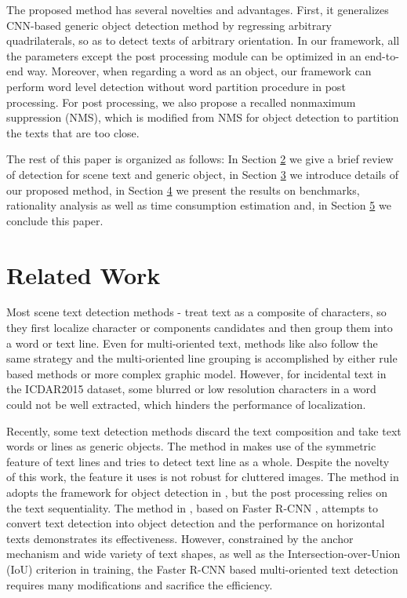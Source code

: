 \documentclass[10pt,twocolumn,letterpaper]{article}
\begin{document}
	The proposed method has several novelties and advantages.
	First, it generalizes CNN-based generic object detection method by regressing arbitrary quadrilaterals, so as to detect texts of arbitrary orientation. 
	In our framework, all the parameters except the post processing module can be optimized in an end-to-end way. 
	Moreover, when regarding a word as an object, our framework can perform word level detection without word partition procedure in post processing.
	For post processing, we also propose a recalled nonmaximum suppression (NMS), which is modified from NMS for object detection to partition the texts that are too close.
	
	
	The rest of this paper is organized as follows: In Section \hyperref[Sec.2]{2} we give a brief review of detection for scene text and generic object, in Section \hyperref[Sec.3]{3} we introduce details of our proposed method, in Section \hyperref[Sec.4]{4} we present the results on benchmarks, rationality analysis as well as time consumption estimation and, in Section \hyperref[Sec.5]{5} we conclude this paper.

\section{Related Work}
	\label{Sec.2}
	 Most scene text detection methods \cite{fcn-text} \cite{ctpn}-\cite{textflow} treat text as a composite of characters, so they first localize character or components candidates and then group them into a word or text line. 
	Even for multi-oriented text, methods like \cite{yao2012detecting} \cite{yin2015multi} \cite{kang2014orientation} \cite{yi2011text} also follow the same strategy and the multi-oriented line grouping is accomplished by either rule based methods or more complex graphic model. 
	However, for incidental text in the ICDAR2015 dataset, some blurred or low resolution characters in a word could not be well extracted, which hinders the performance of localization.
	
	Recently, some text detection methods discard the text composition and take text words or lines as generic objects.
	The method in \cite{symmetry-text} makes use of the symmetric feature of text lines and tries to detect text line as a whole. 
	Despite the novelty of this work, the feature it uses is not robust for cluttered images. 
	The method in \cite{yolo-text} adopts the framework for object detection in \cite{yolo}, but the post processing relies on the text sequentiality.
	The method in \cite{deep-text}, based on Faster R-CNN \cite{faster-rcnn}, attempts to convert text detection into object detection and the performance on horizontal texts demonstrates its effectiveness. However, constrained by the anchor mechanism and wide variety of text shapes, as well as the Intersection-over-Union (IoU) criterion in training, the Faster R-CNN based multi-oriented text detection requires many modifications and sacrifice the efficiency.
	
\end{document}
